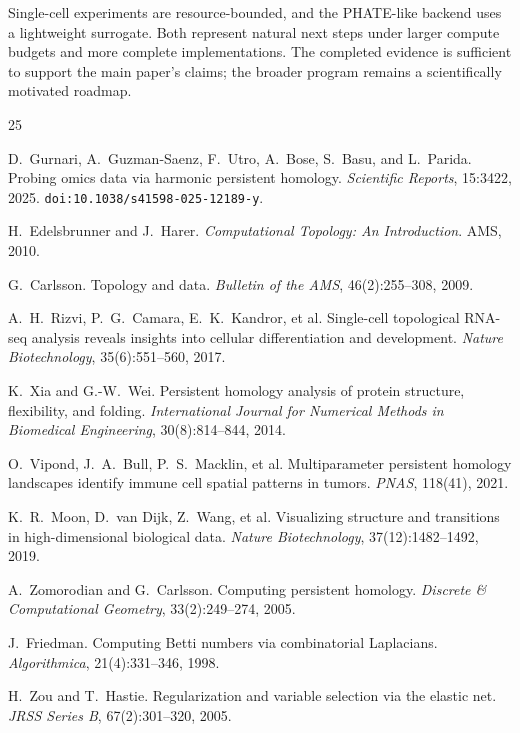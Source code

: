 \documentclass[11pt]{article}
\begin{document}
Single-cell experiments are resource-bounded, and the PHATE-like backend uses a lightweight surrogate.
Both represent natural next steps under larger compute budgets and more complete implementations.
The completed evidence is sufficient to support the main paper's claims; the broader program remains a scientifically motivated roadmap.


\begin{thebibliography}{25}

D.~Gurnari, A.~Guzman-Saenz, F.~Utro, A.~Bose, S.~Basu, and L.~Parida.
Probing omics data via harmonic persistent homology.
\emph{Scientific Reports}, 15:3422, 2025.
\texttt{doi:10.1038/s41598-025-12189-y}.

H.~Edelsbrunner and J.~Harer.
\emph{Computational Topology: An Introduction}.
AMS, 2010.

G.~Carlsson.
Topology and data.
\emph{Bulletin of the AMS}, 46(2):255--308, 2009.

A.~H.~Rizvi, P.~G.~Camara, E.~K.~Kandror, et al.
Single-cell topological RNA-seq analysis reveals insights into cellular differentiation and development.
\emph{Nature Biotechnology}, 35(6):551--560, 2017.

K.~Xia and G.-W.~Wei.
Persistent homology analysis of protein structure, flexibility, and folding.
\emph{International Journal for Numerical Methods in Biomedical Engineering}, 30(8):814--844, 2014.

O.~Vipond, J.~A.~Bull, P.~S.~Macklin, et al.
Multiparameter persistent homology landscapes identify immune cell spatial patterns in tumors.
\emph{PNAS}, 118(41), 2021.

K.~R.~Moon, D.~van Dijk, Z.~Wang, et al.
Visualizing structure and transitions in high-dimensional biological data.
\emph{Nature Biotechnology}, 37(12):1482--1492, 2019.

A.~Zomorodian and G.~Carlsson.
Computing persistent homology.
\emph{Discrete \& Computational Geometry}, 33(2):249--274, 2005.

J.~Friedman.
Computing Betti numbers via combinatorial Laplacians.
\emph{Algorithmica}, 21(4):331--346, 1998.

H.~Zou and T.~Hastie.
Regularization and variable selection via the elastic net.
\emph{JRSS Series B}, 67(2):301--320, 2005.


\end{thebibliography}
\end{document}
